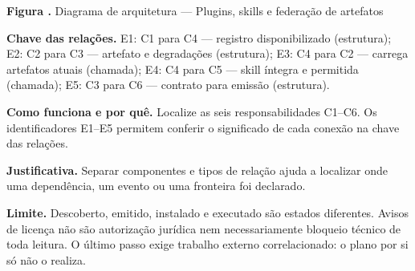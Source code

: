 {\small\textbf{Figura \thefigure.} Diagrama de arquitetura --- Plugins, skills e federação de artefatos}\par\smallskip
{\footnotesize\textbf{Chave das relações.} E1: C1 para C4 --- registro disponibilizado (estrutura); E2: C2 para C3 --- artefato e degradações (estrutura); E3: C4 para C2 --- carrega artefatos atuais (chamada); E4: C4 para C5 --- skill íntegra e permitida (chamada); E5: C3 para C6 --- contrato para emissão (estrutura).}\par\smallskip
\noindent\textbf{Como funciona e por quê.} Localize as seis responsabilidades C1--C6. Os identificadores E1--E5 permitem conferir o significado de cada conexão na chave das relações.\par
\noindent\textbf{Justificativa.} Separar componentes e tipos de relação ajuda a localizar onde uma dependência, um evento ou uma fronteira foi declarado.\par
\noindent\textbf{Limite.} Descoberto, emitido, instalado e executado são estados diferentes. Avisos de licença não são autorização jurídica nem necessariamente bloqueio técnico de toda leitura. O último passo exige trabalho externo correlacionado: o plano por si só não o realiza.\par\smallskip
{}
